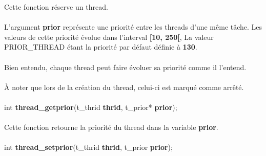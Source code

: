 \documentclass[10pt,a4wide]{article}
\begin{document}
Cette fonction r\'eserve un thread.

\paragraph{}

L'argument \textbf{prior} repr\'esente une priorit\'e entre les threads
d'une m\^eme t\^ache. Les valeurs de cette priorit\'e \'evolue dans
l'interval \textbf{[10, 250[}, La valeur PRIOR\_THREAD \'etant la priorit\'e
par d\'efaut d\'efinie \`a \textbf{130}.

\paragraph{}

Bien entendu, chaque thread peut faire \'evoluer sa priorit\'e comme il
l'entend.

\paragraph{}

\`A noter que lors de la cr\'eation du thread, celui-ci est marqu\'e
comme arr\^et\'e.

\paragraph{}

\hspace{1.5cm}int \textbf{thread\_getprior}(t\_thrid \textbf{thrid},
                                            t\_prior* \textbf{prior});

\paragraph{}

Cette fonction retourne la priorit\'e du thread dans la variable
\textbf{prior}.

\paragraph{}

\hspace{1.5cm}int \textbf{thread\_setprior}(t\_thrid \textbf{thrid},
                                            t\_prior \textbf{prior});

\paragraph{}
\end{document}
